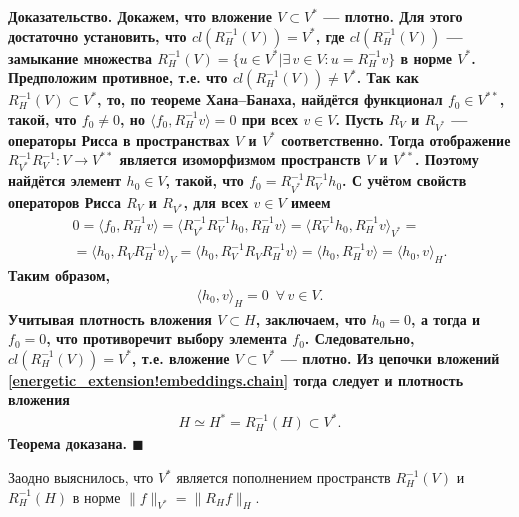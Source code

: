 \documentclass{report}
\newenvironment{Proof}{\par\noindent\bf Доказательство.\rm}{ $\blacksquare$\par}
\begin{document}
\begin{Proof}
Докажем, что вложение $V\subset V^*$ --- плотно. Для этого достаточно установить, что $cl(R_H^{-1}(V))=V^*$, где $cl(R_H^{-1}(V))$ --- замыкание множества $R_H^{-1}(V)=\{u\in V^*|
\exists\,v\in V:u=R_H^{-1}v\}$ в норме $V^*$. Предположим противное, т.е. что $cl(R_H^{-1}(V))\neq V^*$. Так как $R_H^{-1}(V)\subset V^*$, то, по теореме Хана--Банаха, найдётся функционал
$f_0\in V^{**}$, такой, что $f_0\neq0$, но $\langle f_0,R_H^{-1}v\rangle=0$ при всех $v\in V$. Пусть $R_V$ и $R_{V^*}$ --- операторы Рисса в пространствах $V$ и $V^*$ соответственно. Тогда
отображение $R_{V^*}^{-1}R_V^{-1}:V\to V^{**}$ является изоморфизмом пространств $V$ и $V^{**}$. Поэтому найдётся элемент $h_0\in V$, такой, что $f_0=R_{V^*}^{-1}R_V^{-1}h_0$. С учётом
свойств операторов Рисса $R_V$ и $R_{V^*}$, для всех $v\in V$ имеем
\begin{gather*}
0=\langle f_0,R_H^{-1}v\rangle=\langle R_{V^*}^{-1}R_V^{-1}h_0,R_H^{-1}v\rangle=\langle R_V^{-1}h_0,R_H^{-1}v\rangle_{V^*}=\\
=\langle h_0,R_VR_H^{-1}v\rangle_{V}=\langle h_0,R_V^{-1}R_VR_H^{-1}v\rangle=\langle h_0,R_H^{-1}v\rangle=\langle h_0,v\rangle_H.
\end{gather*}
Таким образом,
\begin{gather*}
\langle h_0,v\rangle_H=0\,\,\,\forall\,v\in V.
\end{gather*}
Учитывая плотность вложения $V\subset H$, заключаем, что $h_0=0$, а тогда и $f_0=0$, что противоречит выбору элемента $f_0$. Следовательно, $cl(R_H^{-1}(V))=V^*$, т.е. вложение
$V\subset V^*$ --- плотно. Из цепочки вложений \eqref{energetic_extension!embeddings.chain} тогда следует и плотность вложения
\begin{gather*}
H\simeq H^*=R_H^{-1}(H)\subset V^*.
\end{gather*}
Теорема доказана.
\end{Proof}

Заодно выяснилось, что  $V^*$ является пополнением пространств $R_H^{-1}(V)$ и $R_H^{-1}(H)$ в норме $\|f\|_{V^*}=\|R_Hf\|_H$.
\end{document}
